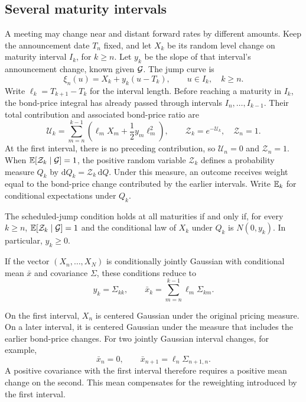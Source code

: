 \subsection{Several maturity intervals}
A meeting may change near and distant forward rates by different amounts. Keep the announcement date $T_n$ fixed, and let $X_k$ be its random level change on maturity interval $I_k$, for $k\ge n$. Let $y_k$ be the slope of that interval's announcement change, known given $\mathcal G$. The jump curve is
\[
\xi_n(u)=X_k+y_k(u-T_k),\qquad u\in I_k,\quad k\ge n.
\]
Write $\ell_k=T_{k+1}-T_k$ for the interval length. Before reaching a maturity in $I_k$, the bond-price integral has already passed through intervals $I_n,\ldots,I_{k-1}$. Their total contribution and associated bond-price ratio are
\[
\mathcal U_k=\sum_{m=n}^{k-1}\left(\ell_mX_m+\frac12y_m\ell_m^2\right),\qquad \mathcal Z_k=e^{-\mathcal U_k},\quad \mathcal Z_n=1.
\]
At the first interval, there is no preceding contribution, so $\mathcal U_n=0$ and $\mathcal Z_n=1$. When $\mathbb E[\mathcal Z_k\mid\mathcal G]=1$, the positive random variable $\mathcal Z_k$ defines a probability measure $Q_k$ by $\mathrm dQ_k=\mathcal Z_k\,\mathrm dQ$. Under this measure, an outcome receives weight equal to the bond-price change contributed by the earlier intervals. Write $\mathbb E_k$ for conditional expectations under $Q_k$.

\begin{theorem}\label{thm:tilts}
The scheduled-jump condition holds at all maturities if and only if, for every $k\ge n$, $\mathbb E[\mathcal Z_k\mid\mathcal G]=1$ and the conditional law of $X_k$ under $Q_k$ is $N(0,y_k)$. In particular, $y_k\ge0$.

If the vector $(X_n,\ldots,X_N)$ is conditionally jointly Gaussian with conditional mean $\bar x$ and covariance $\Sigma$, these conditions reduce to
\begin{equation}
y_k=\Sigma_{kk},\qquad
\bar x_k=\sum_{m=n}^{k-1}\ell_m\Sigma_{km}.\label{eq:gaussjump}
\end{equation}
\end{theorem}
On the first interval, $X_n$ is centered Gaussian under the original pricing measure. On a later interval, it is centered Gaussian under the measure that includes the earlier bond-price changes. For two jointly Gaussian interval changes, for example,
\[
\bar x_n=0,\qquad \bar x_{n+1}=\ell_n\Sigma_{n+1,n}.
\]
A positive covariance with the first interval therefore requires a positive mean change on the second. This mean compensates for the reweighting introduced by the first interval.

